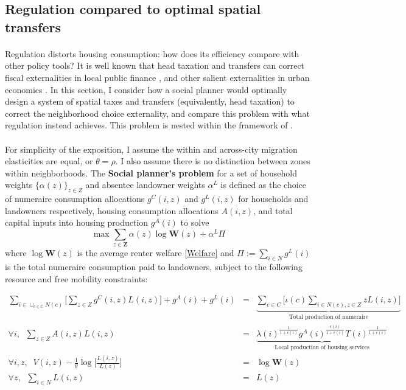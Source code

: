 \documentclass[12pt]{article}
\begin{document}
\subsection{Regulation compared to optimal spatial transfers}
\paragraph*{}
Regulation distorts housing consumption: how does its efficiency compare with other policy tools? It is well known that head taxation and transfers can correct fiscal externalities in local public finance \citep{ineffTiebout}, and other salient externalities in urban economics \citep{efficiency, DFM}. In this section, I consider how a social planner would optimally design a system of spatial taxes and transfers (equivalently, head taxation) to correct the neighborhood choice externality, and compare this problem with what regulation instead achieves. This problem is nested within the framework of \cite{efficiency}. 


\paragraph*{}
For simplicity of the exposition, I assume the within and across-city migration elasticities are equal, or $\theta = \rho$. I also assume there is no distinction between zones within neighborhoods. The \textbf{Social planner's problem} for a set of household weights $\{\alpha(z)\}_{z \in Z}$ and absentee landowner weights $\alpha^{L}$ is defined as the choice of numeraire consumption allocations $g^{C}(i, z)$ and $g^{L}(i, z)$ for households and landowners respectively, housing consumption allocations $A(i, z)$, and total capital inputs into housing production $g^{A}(i)$ to solve
\begin{equation}
	\max   \sum_{z \in \boldsymbol{Z}}\alpha(z)\log \boldsymbol{W}(z) +\alpha^{L}\Pi
\end{equation}
where $\log \boldsymbol{W}(z)$ is the average renter welfare \eqref{Welfare} and $\Pi:= \sum_{i \in N}g^{L}(i)$ is the total numeraire consumption paid to landowners, subject to the following resource and free mobility constraints:

\begin{align}
	\sum_{i \in \cup_{c \in \mathbb{C}}N(c)}\big[\sum_{z \in Z}g^{C}(i, z)L(i, z)\big] + g^{A}(i) + g^{L}(i)& = & \underbrace{\sum_{c \in C}\bigg[\iota(c)\sum_{i \in N(c), z \in Z}zL(i, z) \bigg]}_{\text{Total production of numeraire}} \label{OptPolicy:BalancedGBudget} \\
	\forall i, \; \; \sum_{z \in Z}A(i, z)L(i, z) & = & \underbrace{\lambda(i)^{\frac{1}{1 + \epsilon(i)}}g^{A}(i)^{\frac{\epsilon(i)}{1 + \epsilon(i)}}T(i)^{\frac{1}{1 + \epsilon(i)}}}_{\text{Local production of housing services}} \label{OptPolicy:BalancedHBudget} \\
	\forall i, z,	\; \; V(i, z) - \frac{1}{\theta} \log \bigg[\frac{L(i, z)}{L(z)}\bigg]	 & = & \log \boldsymbol{W}(z) \label{OptPolicy:FreeMobility} 	\\
	\forall z,	\; \;\sum_{i \in N}L(i, z) & = & L(z)	
\end{align}
\end{document}
